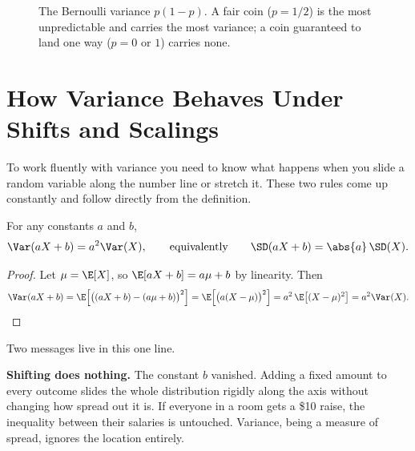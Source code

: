 \begin{figure}[H]
\centering
{}
\caption{The Bernoulli variance $p(1-p)$. A fair coin ($p=1/2$) is the most
unpredictable and carries the most variance; a coin guaranteed to land one
way ($p=0$ or $1$) carries none.}
\label{ch09:fig-bern}
\end{figure}

\section{How Variance Behaves Under Shifts and Scalings}
\label{ch09:affine}

To work fluently with variance you need to know what happens when you slide a
random variable along the number line or stretch it. These two rules come up
constantly and follow directly from the definition.

\begin{proposition}
\label{ch09:prop-affine}
For any constants $a$ and $b$,
\[
  \Var(aX + b) = a^2 \Var(X),
  \qquad\text{equivalently}\qquad
  \SD(aX+b) = \abs{a}\,\SD(X).
\]
\end{proposition}

\begin{proof}
Let $\mu = \E[X]$, so $\E[aX+b] = a\mu + b$ by linearity. Then
\[
  \Var(aX+b) = \E\Big[\big((aX+b) - (a\mu+b)\big)^2\Big]
  = \E\Big[\big(a(X-\mu)\big)^2\Big]
  = a^2\,\E\big[(X-\mu)^2\big] = a^2\Var(X). \qedhere
\]
\end{proof}

Two messages live in this one line.

\textbf{Shifting does nothing.} The constant $b$ vanished. Adding a fixed
amount to every outcome slides the whole distribution rigidly along the axis
without changing how spread out it is. If everyone in a room gets a \$10
raise, the inequality between their salaries is untouched. Variance, being a
measure of spread, ignores the location entirely.

